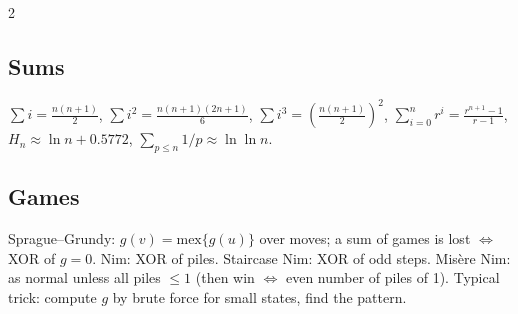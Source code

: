 \documentclass[8pt,a4paper]{extarticle}
\begin{document}
\begin{multicols*}{2}
\subsection{Sums}
$\sum i=\frac{n(n+1)}2$, $\sum i^2=\frac{n(n+1)(2n+1)}6$,
$\sum i^3=\left(\frac{n(n+1)}2\right)^2$,
$\sum_{i=0}^{n} r^i=\frac{r^{n+1}-1}{r-1}$, $H_n\approx\ln n+0.5772$,
$\sum_{p\le n} 1/p \approx \ln\ln n$.

\subsection{Games}
Sprague--Grundy: $g(v)=\mathrm{mex}\{g(u)\}$ over moves;
a sum of games is lost $\iff$ XOR of $g=0$. Nim: XOR of piles.
Staircase Nim: XOR of odd steps. Misère Nim: as normal unless all piles
$\le1$ (then win $\iff$ even number of piles of 1).
Typical trick: compute $g$ by brute force for small states, find the pattern.


\end{multicols*}
\end{document}

